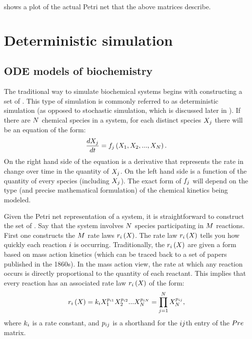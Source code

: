  shows a plot of the actual Petri net that the above matrices describe.

\section{Deterministic simulation}
\subsection{ODE models of biochemistry}
\label{sec:ode_models}

The traditional way to simulate biochemical systems begins with constructing a set of . This type of simulation is commonly referred to as deterministic simulation (as opposed to stochastic simulation, which is discussed later in ). If there are $N$ chemical species in a system, for each distinct species $X_{j}$ there will be an equation of the form:
\begin{equation*}
    \frac{dX_{j}}{dt} = f_{j}\left(X_1, X_2, ..., X_{N}\right).
\end{equation*}
On the right hand side of the equation is a derivative that represents the rate in change over time in the quantity of $X_{j}$. On the left hand side is a function of the quantity of every species (including $X_{j}$). The exact form of $f_{j}$ will depend on the type (and precise mathematical formulation) of the chemical kinetics being modeled.

Given the Petri net representation of a system, it is straightforward to construct the set of . Say that the system involves $N$ species participating in $M$ reactions. First one constructs the $M$ rate laws $r_{i} \left( X_{} \right)$. The rate law $r_{i} \left( X_{} \right)$ tells you how quickly each reaction $i$ is occurring. Traditionally, the $r_{i} \left( X_{} \right)$ are given a form based on mass action kinetics (which can be traced back to a set of papers published in the 1860s\cite{Waage:1986bf}). In the mass action view, the rate at which any reaction occurs is directly proportional to the quantity of each reactant. This implies that every reaction has an associated rate law $r_{i} \left( X_{} \right)$ of the form:
\begin{equation}\label{eq:ratelaw_general_formula}
    r_{i} \left( X_{} \right) = k_{i} X_1^{p_{i 1}} X_2^{p_{i 2}} ... X_{N}^{p_{i N}} = \prod_{j = 1}^{N} X_{N}^{p_{i j}},
\end{equation}
where $k_{i}$ is a rate constant, and $p_{i j}$ is a shorthand for the $i j$th entry of the $Pre$ matrix.


